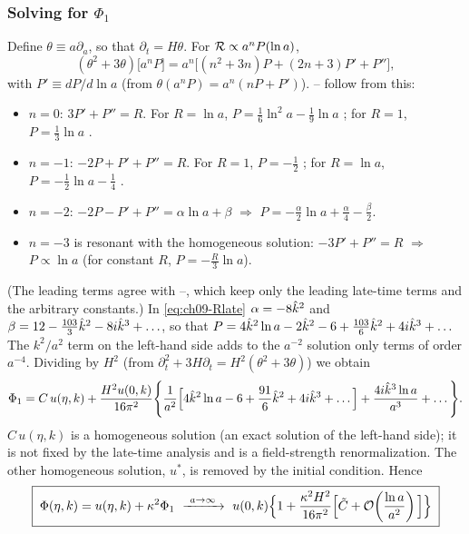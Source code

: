 \subsubsection{Solving for \texorpdfstring{$\Phi_1$}{Phi1}}
Define $\theta\equiv a\partial_a$, so that $\partial_t=H\theta$. For $\mathcal{R}\propto a^nP(\ln a)$,
\begin{equation}
(\theta^2+3\theta)\big[a^nP\big]=a^n\big[(n^2+3n)P+(2n+3)P'+P''\big],
\label{eq:ch09-theta}
\end{equation}
with $P'\equiv dP/d\ln a$ (from $\theta(a^nP)=a^n(nP+P')$). -- follow from this:
\begin{itemize}[leftmargin=14pt]
\item $n=0$: $3P'+P''=R$. For $R=\ln a$, $P=\tfrac16\ln^2a-\tfrac19\ln a$ ; for $R=1$, $P=\tfrac13\ln a$ .
\item $n=-1$: $-2P+P'+P''=R$. For $R=1$, $P=-\tfrac12$ ; for $R=\ln a$, $P=-\tfrac12\ln a-\tfrac14$ .
\item $n=-2$: $-2P-P'+P''=\alpha\ln a+\beta$ $\Rightarrow$ $P=-\tfrac\alpha2\ln a+\tfrac\alpha4-\tfrac\beta2$.
\item $n=-3$ is resonant with the homogeneous solution: $-3P'+P''=R$ $\Rightarrow$ $P\propto\ln a$ (for constant $R$, $P=-\tfrac R3\ln a$).
\end{itemize}
(The leading terms agree with \PII{} --, which keep only the leading late-time terms and the arbitrary constants.)
In \eqref{eq:ch09-Rlate} $\alpha=-8\hat k^2$ and $\beta=12-\tfrac{103}3\hat k^2-8i\hat k^3+\ldots$, so that $P=4\hat k^2\ln a-2\hat k^2-6+\tfrac{103}{6}\hat k^2+4i\hat k^3+\ldots$
The $k^2/a^2$ term on the left-hand side adds to the $a^{-2}$ solution only terms of order $a^{-4}$. Dividing by $H^2$ (from $\partial_t^2+3H\partial_t=H^2(\theta^2+3\theta)$) we obtain \tD
\begin{equation}
\Phi_1=C\,u(\eta,k)+\frac{H^2u(0,k)}{16\pi^2}\Bigg\{\frac{1}{a^2}\Big[4\hat k^2\ln a-6+\frac{91}6\hat k^2+4i\hat k^3+\ldots\Big]+\frac{4i\hat k^3\ln a}{a^3}+\ldots\Bigg\}.
\label{eq:ch09-Phi1}
\end{equation}
$C\,u(\eta,k)$ is a homogeneous solution (an exact solution of the left-hand side); it is not fixed by the late-time analysis and is a field-strength renormalization.
The other homogeneous solution, $u^*$, is removed by the initial condition. Hence
\begin{equation}
\boxed{\;\Phi(\eta,k)=u(\eta,k)+\kappa^2\Phi_1\ \xrightarrow{\ a\to\infty\ }\ u(0,k)\Big\{1+\frac{\kappa^2H^2}{16\pi^2}\Big[\tilde C+\order{\frac{\ln a}{a^2}}\Big]\Big\}\;}
\label{eq:ch09-final}
\end{equation}
